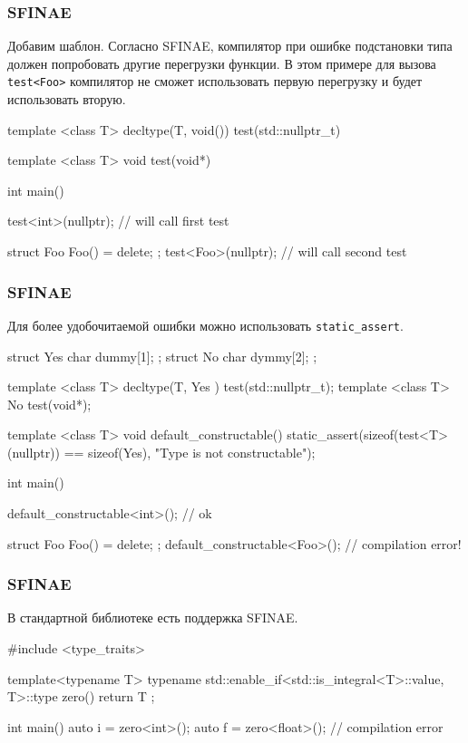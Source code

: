 \documentclass[compress, 8pt, aspectratio=169]{beamer}
\begin{document}
  \begin{frame}[fragile]

    \frametitle{SFINAE}

    Добавим шаблон.
    Согласно SFINAE, компилятор при ошибке подстановки типа
    должен попробовать другие перегрузки функции.
    В этом примере для вызова \verb|test<Foo>| компилятор не сможет
    использовать первую перегрузку и будет использовать вторую.

    \begin{myinplacelisting}[minted language=cpp]
template <class T>
decltype(T{}, void()) test(std::nullptr_t) {}

template <class T>
void test(void*) {}

int main() {
    test<int>(nullptr); // will call first test

    struct Foo { Foo() = delete; };
    test<Foo>(nullptr); // will call second test
}
    \end{myinplacelisting}

  \end{frame}

  \begin{frame}[fragile]

    \frametitle{SFINAE}

    Для более удобочитаемой ошибки можно использовать \verb|static_assert|.

    \begin{myinplacelisting}[minted language=cpp]
struct Yes { char dummy[1]; };
struct No { char dymmy[2]; };

template <class T> decltype(T{}, Yes {}) test(std::nullptr_t);
template <class T> No test(void*);

template <class T> void default_constructable() {
    static_assert(sizeof(test<T>(nullptr)) == sizeof(Yes),
        "Type is not constructable");
}

int main() {
    default_constructable<int>(); // ok

    struct Foo { Foo() = delete; };
    default_constructable<Foo>(); // compilation error!
}
    \end{myinplacelisting}

  \end{frame}

  \begin{frame}[fragile]

    \frametitle{SFINAE}

    В стандартной библиотеке есть поддержка\footnotemark{} SFINAE.


    \begin{myinplacelisting}[minted language=cpp]
#include <type_traits>

template<typename T>
typename std::enable_if<std::is_integral<T>::value, T>::type
zero() {
    return T {};
}

int main() {
    auto i = zero<int>();
    auto f = zero<float>(); // compilation error
}
    \end{myinplacelisting}

  \end{frame}
\end{document}
